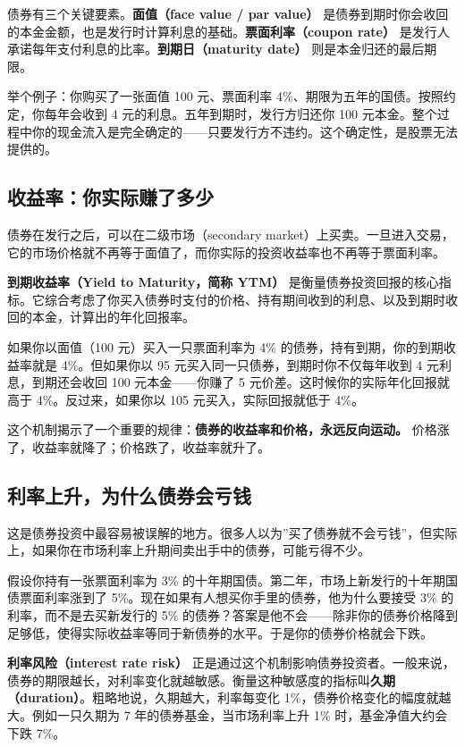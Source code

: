 \documentclass[a4paper,11pt,oneside,fontset=none,UTF8,zihao=-4]{ctexbook}
\begin{document}
债券有三个关键要素。\textbf{面值（face value / par value）}
是债券到期时你会收回的本金金额，也是发行时计算利息的基础。\textbf{票面利率（coupon
rate）} 是发行人承诺每年支付利息的比率。\textbf{到期日（maturity date）}
则是本金归还的最后期限。

举个例子：你购买了一张面值 100 元、票面利率
4\%、期限为五年的国债。按照约定，你每年会收到 4
元的利息。五年到期时，发行方归还你 100
元本金。整个过程中你的现金流入是完全确定的------只要发行方不违约。这个确定性，是股票无法提供的。

\subsection{收益率：你实际赚了多少}\label{ux6536ux76caux7387ux4f60ux5b9eux9645ux8d5aux4e86ux591aux5c11}

债券在发行之后，可以在二级市场（secondary
market）上买卖。一旦进入交易，它的市场价格就不再等于面值了，而你实际的投资收益率也不再等于票面利率。

\textbf{到期收益率（Yield to Maturity，简称 YTM）}
是衡量债券投资回报的核心指标。它综合考虑了你买入债券时支付的价格、持有期间收到的利息、以及到期时收回的本金，计算出的年化回报率。

如果你以面值（100 元）买入一只票面利率为 4\%
的债券，持有到期，你的到期收益率就是 4\%。但如果你以 95
元买入同一只债券，到期时你不仅每年收到 4 元利息，到期还会收回 100
元本金------你赚了 5 元价差。这时候你的实际年化回报就高于
4\%。反过来，如果你以 105 元买入，实际回报就低于 4\%。

这个机制揭示了一个重要的规律：\textbf{债券的收益率和价格，永远反向运动。}
价格涨了，收益率就降了；价格跌了，收益率就升了。

\subsection{利率上升，为什么债券会亏钱}\label{ux5229ux7387ux4e0aux5347ux4e3aux4ec0ux4e48ux503aux5238ux4f1aux4e8fux94b1}

这是债券投资中最容易被误解的地方。很多人以为''买了债券就不会亏钱''，但实际上，如果你在市场利率上升期间卖出手中的债券，可能亏得不少。

假设你持有一张票面利率为 3\%
的十年期国债。第二年，市场上新发行的十年期国债票面利率涨到了
5\%。现在如果有人想买你手里的债券，他为什么要接受 3\%
的利率，而不是去买新发行的 5\%
的债券？答案是他不会------除非你的债券价格降到足够低，使得实际收益率等同于新债券的水平。于是你的债券价格就会下跌。

\textbf{利率风险（interest rate risk）}
正是通过这个机制影响债券投资者。一般来说，债券的期限越长，对利率变化就越敏感。衡量这种敏感度的指标叫\textbf{久期（duration）}。粗略地说，久期越大，利率每变化
1\%，债券价格变化的幅度就越大。例如一只久期为 7
年的债券基金，当市场利率上升 1\% 时，基金净值大约会下跌 7\%。
\end{document}
